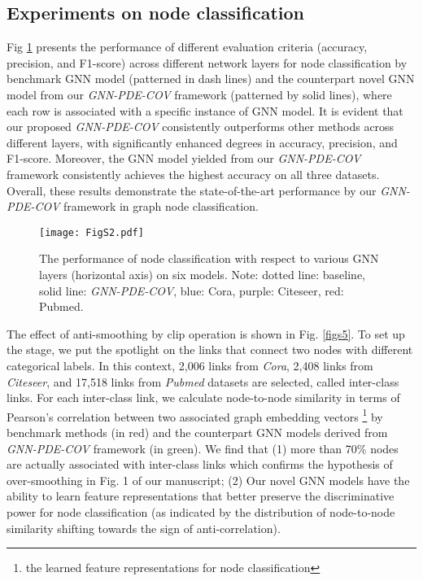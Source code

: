\documentclass{article}
\begin{document}
\subsection{Experiments on node classification}
Fig \ref{figs2} presents the performance of different evaluation criteria (accuracy, precision, and F1-score) across different network layers for node classification by benchmark GNN model (patterned in dash lines) and the counterpart novel GNN model from our \textit{GNN-PDE-COV} framework (patterned by solid lines), where each row is associated with a specific instance of GNN model. It is evident that our proposed \textit{GNN-PDE-COV} consistently outperforms other methods across different layers, with significantly enhanced degrees in accuracy, precision, and F1-score. Moreover, the GNN model yielded from our \textit{GNN-PDE-COV} framework consistently achieves the highest accuracy on all three datasets. Overall, these results demonstrate the state-of-the-art performance by our \textit{GNN-PDE-COV} framework in graph node classification.

\begin{figure}[h]
  \centering
  \texttt{[image: FigS2.pdf]}
  \vspace{-0.5em}
  \caption{The performance of node classification with respect to various GNN layers (horizontal axis) on six models. Note: dotted line: baseline, solid line: \textit{GNN-PDE-COV}, blue: Cora, purple: Citeseer, red: Pubmed.}
  \label{figs2}
  \vspace{-0.5em}
\end{figure}

The effect of anti-smoothing by clip operation is shown in Fig. \ref{figs5}. To set up the stage, we put the spotlight on the links that connect two nodes with different categorical labels. In this context, 2,006 links from \textit{Cora}, 2,408 links from \textit{Citeseer}, and 17,518 links from \textit{Pubmed} datasets are selected, called inter-class links. For each inter-class link, we calculate node-to-node similarity in terms of Pearson's correlation between two associated graph embedding vectors  \footnote{the learned feature representations for node classification} by benchmark methods (in red) and the counterpart GNN models derived from \textit{GNN-PDE-COV} framework (in green). We find that (1) more than 70\% nodes are actually associated with inter-class links which confirms the hypothesis of over-smoothing in Fig. 1 of our manuscript; (2) Our novel GNN models have the ability to learn feature representations that better preserve the discriminative power for node classification (as indicated by the distribution of node-to-node similarity shifting towards the sign of anti-correlation).
\end{document}
